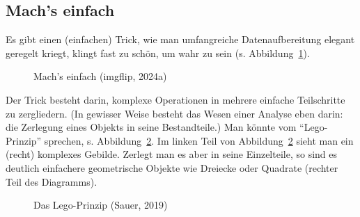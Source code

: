 \documentclass[
  a4paper,
]{scrbook}
\theoremstyle{definition}
\theoremstyle{definition}
\theoremstyle{definition}
\theoremstyle{remark}
\begin{document}
\subsection{Mach's einfach}\label{machs-einfach}

Es gibt einen (einfachen) Trick, wie man umfangreiche Datenaufbereitung
elegant geregelt kriegt, klingt fast zu schön, um wahr zu sein (s.
Abbildung~\ref{fig-that-would-be-great}).

\begin{figure}


\caption{\label{fig-that-would-be-great}Mach's einfach (imgflip, 2024a)}

\end{figure}%

Der Trick besteht darin, komplexe Operationen in mehrere einfache
Teilschritte zu zergliedern. (In gewisser Weise besteht das Wesen einer
Analyse eben darin: die Zerlegung eines Objekts in seine Bestandteile.)
Man könnte vom ``Lego-Prinzip'' sprechen, s. Abbildung~\ref{fig-lego}.
Im linken Teil von Abbildung~\ref{fig-lego} sieht man ein (recht)
komplexes Gebilde. Zerlegt man es aber in seine Einzelteile, so sind es
deutlich einfachere geometrische Objekte wie Dreiecke oder Quadrate
(rechter Teil des Diagramms).

\begin{figure}


\caption{\label{fig-lego}Das Lego-Prinzip (Sauer, 2019)}

\end{figure}%
\end{document}
